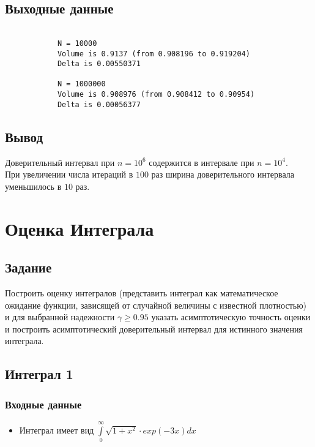 \documentclass{article}
\begin{document}
    \subsection{Выходные данные}
        \begin{minipage}{\linewidth}
            \begin{verbatim}

            N = 10000
            Volume is 0.9137 (from 0.908196 to 0.919204)
            Delta is 0.00550371

            N = 1000000
            Volume is 0.908976 (from 0.908412 to 0.90954)
            Delta is 0.00056377

            \end{verbatim}
        \end{minipage}
    \subsection{Вывод}
        Доверительный интервал при $n = 10^6$ содержится в интервале при $n = 10^4$.\\
        При увеличении числа итераций в $100$ раз ширина доверительного интервала уменьшилось в $10$ раз.
\section{Оценка Интеграла}
    \subsection{Задание}
    Построить оценку интегралов (представить интеграл как математическое ожидание функции,
    зависящей от случайной величины с известной плотностью) и для выбранной надежности $\gamma \geq 0.95$ указать
    асимптотическую точность оценки и построить асимптотический доверительный интервал для истинного
    значения интеграла. 
    \subsection{Интеграл 1}
        \subsubsection{Входные данные}
            \begin{itemize}
                \item Интеграл имеет вид ${\displaystyle \int\limits_{0}^{\infty}\sqrt{1 + x^2} \cdot exp(-3x) dx}$
            \end{itemize}
\end{document}
